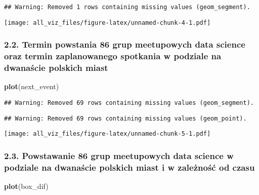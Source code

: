 \documentclass[]{article}
\newenvironment{Shaded}{\begin{snugshade}}{\end{snugshade}}
\newcommand{\KeywordTok}[1]{\textcolor[rgb]{0.13,0.29,0.53}{\textbf{#1}}}
\newcommand{\NormalTok}[1]{#1}
\begin{document}
\begin{verbatim}
## Warning: Removed 1 rows containing missing values (geom_segment).
\end{verbatim}

\texttt{[image: all\_viz\_files/figure-latex/unnamed-chunk-4-1.pdf]}

\hypertarget{termin-powstania-86-grup-meetupowych-data-science-oraz-termin-zaplanowanego-spotkania-w-podziale-na-dwanascie-polskich-miast}{%
\subsubsection{2.2. Termin powstania 86 grup meetupowych data science
oraz termin zaplanowanego spotkania w podziale na dwanaście polskich
miast}\label{termin-powstania-86-grup-meetupowych-data-science-oraz-termin-zaplanowanego-spotkania-w-podziale-na-dwanascie-polskich-miast}}

\begin{Shaded}
\begin{Highlighting}[]
\KeywordTok{plot}\NormalTok{(next_event)}
\end{Highlighting}
\end{Shaded}

\begin{verbatim}
## Warning: Removed 69 rows containing missing values (geom_segment).
\end{verbatim}

\begin{verbatim}
## Warning: Removed 69 rows containing missing values (geom_point).
\end{verbatim}

\texttt{[image: all\_viz\_files/figure-latex/unnamed-chunk-5-1.pdf]}

\hypertarget{powstawanie-86-grup-meetupowych-data-science-w-podziale-na-dwanascie-polskich-miast-i-w-zaleznosc-od-czasu}{%
\subsubsection{2.3. Powstawanie 86 grup meetupowych data science w
podziale na dwanaście polskich miast i w zależność od
czasu}\label{powstawanie-86-grup-meetupowych-data-science-w-podziale-na-dwanascie-polskich-miast-i-w-zaleznosc-od-czasu}}

\begin{Shaded}
\begin{Highlighting}[]
\KeywordTok{plot}\NormalTok{(box_dif)}
\end{Highlighting}
\end{Shaded}
\end{document}
